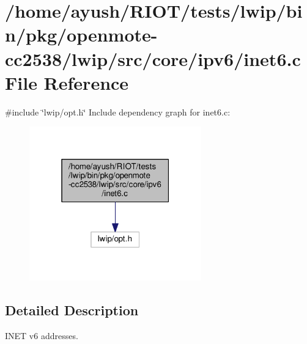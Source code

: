 \hypertarget{openmote-cc2538_2lwip_2src_2core_2ipv6_2inet6_8c}{}\section{/home/ayush/\+R\+I\+O\+T/tests/lwip/bin/pkg/openmote-\/cc2538/lwip/src/core/ipv6/inet6.c File Reference}
\label{openmote-cc2538_2lwip_2src_2core_2ipv6_2inet6_8c}
{\ttfamily \#include \char`\"{}lwip/opt.\+h\char`\"{}}\newline
Include dependency graph for inet6.\+c\+:
\nopagebreak
\begin{figure}[H]
\begin{center}
\leavevmode
\includegraphics[width=211pt]{openmote-cc2538_2lwip_2src_2core_2ipv6_2inet6_8c__incl}
\end{center}
\end{figure}


\subsection{Detailed Description}
I\+N\+ET v6 addresses. 